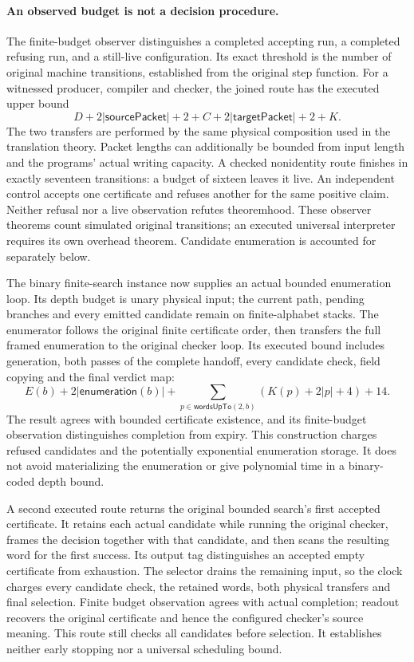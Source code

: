 \documentclass[11pt]{article}
\newcommand{\size}[1]{\lvert #1\rvert}
\begin{document}
\paragraph{An observed budget is not a decision procedure.}
The finite-budget observer distinguishes a completed accepting run, a
completed refusing run, and a still-live configuration. Its exact threshold
is the number of original machine transitions, established from the
original step function. For a witnessed producer, compiler and checker,
the joined route has the executed upper bound
\[
 D+2\size{\mathsf{sourcePacket}}+2+C+
   2\size{\mathsf{targetPacket}}+2+K.
\]
The two transfers are performed by the same physical composition used in
the translation theory. Packet lengths can additionally be bounded from
input length and the programs' actual writing capacity. A checked
nonidentity route finishes in exactly seventeen transitions: a budget of
sixteen leaves it live. An independent control accepts one certificate and
refuses another for the same positive claim. Neither refusal nor a live
observation refutes theoremhood. These observer theorems count simulated
original transitions; an executed universal interpreter requires its own
overhead theorem. Candidate enumeration is accounted for separately below.

The binary finite-search instance now supplies an actual bounded enumeration
loop. Its depth budget is unary physical input; the current path, pending
branches and every emitted candidate remain on finite-alphabet stacks.
The enumerator follows the original finite certificate order, then transfers
the full framed enumeration to the original checker loop. Its executed bound
includes generation, both passes of the complete handoff, every candidate
check, field copying and the final verdict map:
\[
 E(b)+2\size{\mathsf{enumeration}(b)}+
 \sum_{p\in\mathsf{wordsUpTo}(2,b)}(K(p)+2\size{p}+4)+14.
\]
The result agrees with bounded certificate existence, and its finite-budget
observation distinguishes completion from expiry. This construction charges
refused candidates and the potentially exponential enumeration storage.
It does not avoid materializing the enumeration or give polynomial time in
a binary-coded depth bound.

A second executed route returns the original bounded search's first
accepted certificate. It retains each actual candidate while running the
original checker, frames the decision together with that candidate, and
then scans the resulting word for the first success. Its output tag
distinguishes an accepted empty certificate from exhaustion. The selector
drains the remaining input, so the clock charges every candidate check,
the retained words, both physical transfers and final selection. Finite
budget observation agrees with actual completion; readout recovers the
original certificate and hence the configured checker's source meaning.
This route still checks all candidates before selection. It establishes
neither early stopping nor a universal scheduling bound.
\end{document}
